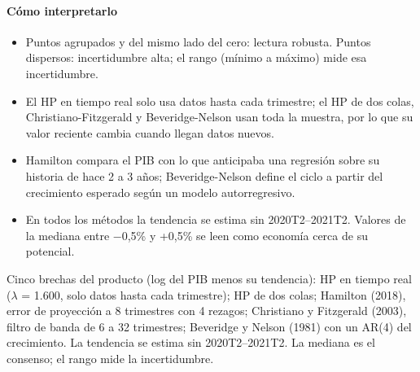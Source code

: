 \paragraph{Cómo interpretarlo}
\begin{itemize}
\item Puntos agrupados y del mismo lado del cero: lectura robusta. Puntos dispersos: incertidumbre alta; el rango (mínimo a máximo) mide esa incertidumbre.
\item El HP en tiempo real solo usa datos hasta cada trimestre; el HP de dos colas, Christiano-Fitzgerald y Beveridge-Nelson usan toda la muestra, por lo que su valor reciente cambia cuando llegan datos nuevos.
\item Hamilton compara el PIB con lo que anticipaba una regresión sobre su historia de hace 2 a 3 años; Beveridge-Nelson define el ciclo a partir del crecimiento esperado según un modelo autorregresivo.
\item En todos los métodos la tendencia se estima sin 2020T2–2021T2. Valores de la mediana entre −0,5\% y +0,5\% se leen como economía cerca de su potencial.
\end{itemize}
\begin{formulas}[Fórmulas]
\end{formulas}
\begin{metodo}[Metodología]
Cinco brechas del producto (log del PIB menos su tendencia): HP en tiempo real ($\lambda$ = 1.600, solo datos hasta cada trimestre); HP de dos colas; Hamilton (2018), error de proyección a 8 trimestres con 4 rezagos; Christiano y Fitzgerald (2003), filtro de banda de 6 a 32 trimestres; Beveridge y Nelson (1981) con un AR(4) del crecimiento. La tendencia se estima sin 2020T2–2021T2. La mediana es el consenso; el rango mide la incertidumbre.
\par{}
\end{metodo}

